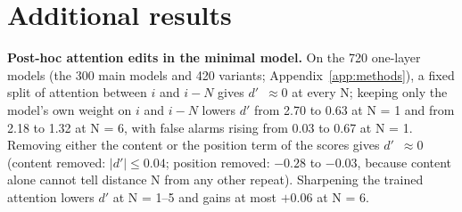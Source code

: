 \documentclass{article}
\newcommand{\dprime}{$d'$}
\begin{document}
\section{Additional results}
\label{app:results}

\begin{table}[h]
  \centering\small
  \caption{\dprime{} by model and N (line-by-line format, correct earlier answers shown), and false-alarm rates on N$\pm$1 lures versus other non-matches at N = 2.}
  \label{tab:l2}
  
\end{table}

\begin{table}[h]
  \centering\small
  \caption{Change in \dprime{} under each intervention; bold entries have 95\% bootstrap intervals excluding zero. $^\dagger$ degenerate baseline (excluded from summaries).}
  \label{tab:b1}
  
\end{table}

\begin{table}[h]
  \centering\small
  \caption{Locating analysis (share of misses with attention off target, on target but lost in later layers, or on target with the heads' output already wrong) and probe results (AUC of the model's own decision and of the probe for matches versus lures, and share of the model's lure false alarms the probe classifies as lures) per model.}
  \label{tab:l7l8}
  \setlength{\tabcolsep}{4.5pt}
  
\end{table}

\textbf{Post-hoc attention edits in the minimal model.} On the 720 one-layer models (the 300 main models and 420 variants; Appendix~\ref{app:methods}), a fixed split of attention between $i$ and $i-N$ gives \dprime{}~$\approx0$ at every N; keeping only the model's own weight on $i$ and $i-N$ lowers \dprime{} from 2.70 to 0.63 at N = 1 and from 2.18 to 1.32 at N = 6, with false alarms rising from 0.03 to 0.67 at N = 1. Removing either the content or the position term of the scores gives \dprime{}~$\approx0$ (content removed: $|d'|\le0.04$; position removed: $-0.28$ to $-0.03$, because content alone cannot tell distance N from any other repeat). Sharpening the trained attention lowers \dprime{} at N = 1--5 and gains at most $+0.06$ at N = 6.

\clearpage

\end{document}
